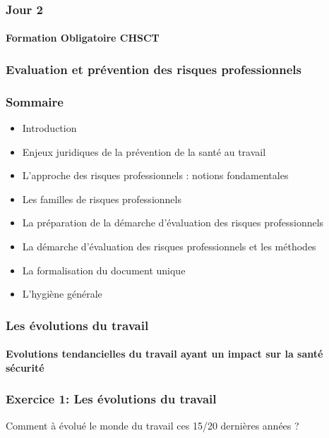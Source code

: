 \documentclass{beamer}
\begin{document}
\begin{frame}
\frametitle{Jour 2}
\framesubtitle{Formation Obligatoire CHSCT}
\end{frame}

\begin{frame}
\frametitle{Evaluation et prévention des risques professionnels}

\end{frame}


\begin{frame}
\frametitle{Sommaire}

\begin{itemize}
\item Introduction

\item Enjeux juridiques de la prévention de la santé au travail

\item L’approche des risques professionnels : notions fondamentales

\item Les familles de risques professionnels

\item La préparation de la démarche d’évaluation des risques professionnels

\item La démarche d’évaluation des risques professionnels et les méthodes

\item La formalisation du document unique
\item L’hygiène générale
\end{itemize}
\end{frame} 


\begin{frame}
\frametitle{Les évolutions du travail}
\framesubtitle{Evolutions tendancielles du travail ayant un impact sur la santé sécurité}
\end{frame} 


\begin{frame}
\frametitle{Exercice 1: Les évolutions du travail}

Comment à évolué le monde du travail ces 15/20 dernières années ?

\end{frame} 
\end{document}
